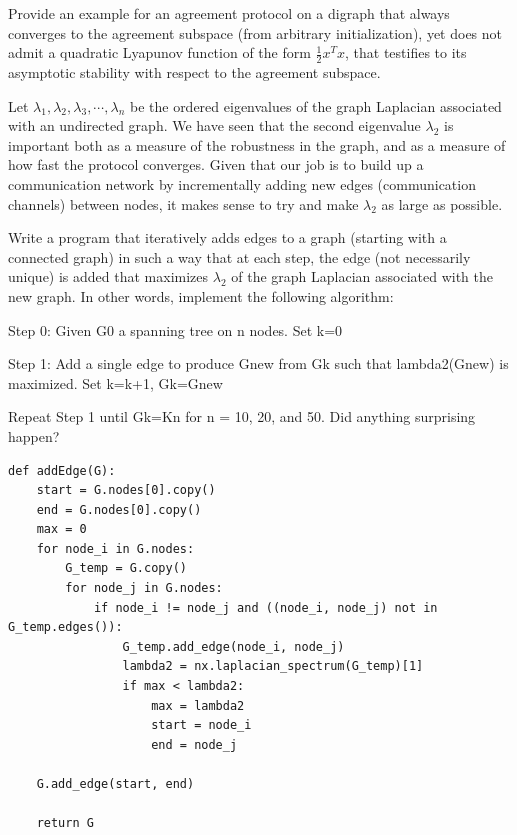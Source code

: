 \documentclass{article}
\begin{document}
\begin{problem}
    Provide an example for an agreement protocol on a digraph that always converges to the agreement subspace (from arbitrary initialization), yet does not admit a quadratic Lyapunov function of the form $\frac{1}{2} x^T x$, that testiﬁes to its asymptotic stability with respect to the agreement subspace.
\end{problem}
\begin{problem}
Let $\lambda_1, \lambda_2, \lambda_3, \cdots, \lambda_n $ be the ordered eigenvalues of the graph Laplacian associated with an undirected graph. We have seen that the second eigenvalue $\lambda_2$ is important both as a measure of the robustness in the graph, and as a measure of how fast the protocol converges. Given that our job is to build up a communication network by incrementally adding new edges (communication channels) between nodes, it makes sense to try and make $\lambda_2$ as large as possible.
    
Write a program that iteratively adds edges to a graph (starting with a connected graph) in such a way that at each step, the edge (not necessarily unique) is added that maximizes $\lambda_2$ of the graph Laplacian associated with the new graph. In other words, implement the following algorithm: 

Step 0: Given G0 a spanning tree on n nodes. Set k=0

Step 1: Add a single edge to produce Gnew from Gk such that lambda2(Gnew) is maximized. Set k=k+1, Gk=Gnew

Repeat Step 1 until Gk=Kn for n = 10, 20, and 50. Did anything surprising happen?

\begin{verbatim}
def addEdge(G):
    start = G.nodes[0].copy()
    end = G.nodes[0].copy()
    max = 0    
    for node_i in G.nodes:
        G_temp = G.copy()
        for node_j in G.nodes:
            if node_i != node_j and ((node_i, node_j) not in G_temp.edges()):
                G_temp.add_edge(node_i, node_j)
                lambda2 = nx.laplacian_spectrum(G_temp)[1]
                if max < lambda2:
                    max = lambda2
                    start = node_i
                    end = node_j
    
    G.add_edge(start, end)
              
    return G
\end{verbatim}


\end{problem}
\end{document}
